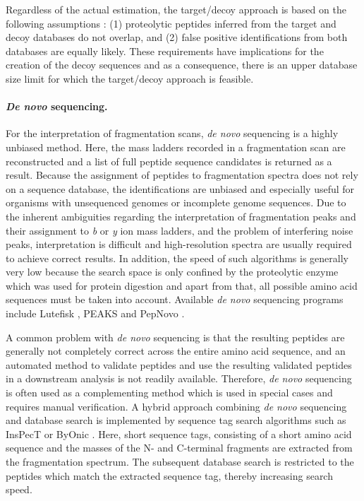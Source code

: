 Regardless of the actual estimation, the target/decoy approach is based on 
the following assumptions \citep{Elias2007}: (1) proteolytic peptides inferred 
from the target and decoy databases do not overlap, and (2) false positive 
identifications from both databases are equally likely.
These requirements have implications for the creation of the decoy sequences
and as a consequence, there is an upper database size limit for which the 
target/decoy approach is feasible.

\paragraph{{\em De novo} sequencing.}

For the interpretation of fragmentation scans, {\em de novo} sequencing is
a highly unbiased method.
Here, the mass ladders recorded in a fragmentation scan are reconstructed
and a list of full peptide sequence candidates is returned as a result.
Because the assignment of peptides to fragmentation spectra does not rely
on a sequence database, the identifications are unbiased and especially
useful for organisms with unsequenced genomes or incomplete genome sequences.
Due to the inherent ambiguities regarding the interpretation of fragmentation
peaks and their assignment to {\em b} or {\em y} ion mass ladders, and the 
problem of interfering noise peaks, interpretation is difficult and 
high-resolution spectra are usually required to achieve correct results.
In addition, the speed of such algorithms is generally very low because the
search space is only confined by the proteolytic enzyme which was used
for protein digestion and apart from that, all possible amino acid sequences
must be taken into account.
Available {\em de novo} sequencing programs include Lutefisk 
\citep{Johnson2002}, PEAKS \citep{Ma2003} and PepNovo \citep{Frank2005}.

A common problem with {\em de novo} sequencing is that the resulting peptides
are generally not completely correct across the entire amino acid sequence, 
and an automated method to validate peptides and use the resulting validated 
peptides in a downstream analysis is not readily available. 
Therefore, {\em de novo} sequencing is often used as a complementing method 
which is used in special cases and requires manual verification.
A hybrid approach combining {\em de novo} sequencing and database search
is implemented by sequence tag search algorithms such as InsPecT 
\citep{Tanner2005} or ByOnic \citep{Bern2007}.
Here, short sequence tags, consisting of a short amino acid sequence and the
masses of the N- and C-terminal fragments are extracted from the fragmentation 
spectrum.
The subsequent database search is restricted to the peptides which match
the extracted sequence tag, thereby increasing search speed.


